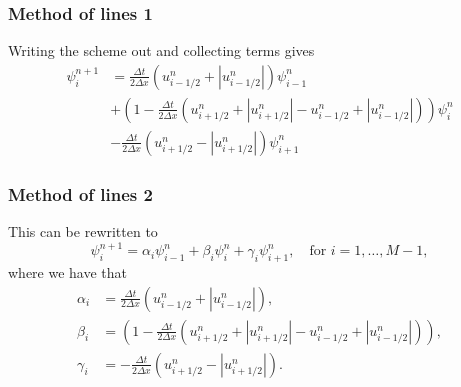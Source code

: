 \documentclass[hyperref={pdfstartview=Fit}]{beamer}
\providecommand{\abs}[1]{\left\lvert#1\right\rvert}
\begin{document}
\begin{frame}
\frametitle{Method of lines 1}
Writing the scheme out and collecting terms gives
\begin{equation*}
\begin{split}
\psi_i^{n+1} &=
\frac{\Delta t}{2 \Delta x} \left( u_{i-1/2}^n + \abs{u_{i-1/2}^n} \right) \psi_{i-1}^n\\
&+ \left(1 - \frac{\Delta t}{2 \Delta x} \left( u_{i+1/2}^n + \abs{u_{i+1/2}^n} - u_{i-1/2}^n + \abs{u_{i-1/2}^n} \right) \right) \psi_i^n\\
&-\frac{\Delta t}{2 \Delta x} \left( u_{i+1/2}^n - \abs{u_{i+1/2}^n} \right) \psi_{i+1}^n
\end{split}
\end{equation*}
\end{frame}

\begin{frame}
\frametitle{Method of lines 2}
This can be rewritten to 
\begin{equation*}
\psi_i^{n+1} = \alpha_i \psi_{i-1}^n + \beta_i \psi_i^n +\gamma_i \psi_{i+1}^n, \quad \text{for } i=1,\ldots,M-1,
\end{equation*}
 where we have that
\begin{align*}
\alpha_i &= \frac{\Delta t}{2 \Delta x} \left( u_{i-1/2}^n + \abs{u_{i-1/2}^n} \right),\\
 \beta_i &= \left(1 - \frac{\Delta t}{2 \Delta x} \left( u_{i+1/2}^n + \abs{u_{i+1/2}^n} - u_{i-1/2}^n + \abs{u_{i-1/2}^n} \right) \right),\\
\gamma_i &= -\frac{\Delta t}{2 \Delta x} \left( u_{i+1/2}^n - \abs{u_{i+1/2}^n} \right).
\end{align*}
\end{frame}
\end{document}
